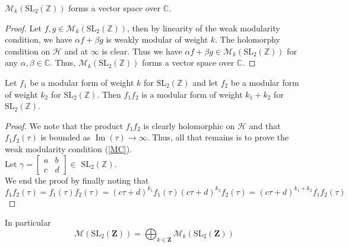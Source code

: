 \begin{proposition}
    $\mathcal{M}_{k}\left(\mathrm{SL}_{2}(\mathbb{Z})\right)$ forms a vector space over $\mathbb{C}$.
    \begin{proof}
         Let $f, g \in \mathcal{M}_{k}\left(\mathrm{SL}_{2}(\mathbb{Z})\right)$, then by linearity of the weak modularity condition, we have $\alpha f+\beta g$ is weakly modular of weight $k$. The holomorphy condition on $\mathcal{H}$ and at $\infty$ is clear. Thus we have $\alpha f+\beta g\in \mathcal{M}_{k}\left(\mathrm{SL}_{2}(\mathbb{Z})\right)$ for any $\alpha, \beta \in \mathbb{C}$.  Thus, $\mathcal{M}_{k}\left(\mathrm{SL}_{2}(\mathbb{Z})\right)$ forms a vector space over $\mathbb{C}$.
    \end{proof}
\end{proposition}

\begin{lemma}
Let $f_{1}$ be a modular form of weight $k$ for $\mathrm{SL}_{2}(\mathbb{Z})$ and let $f_{2}$ be a modular form of weight $k_{2}$ for $\mathrm{SL}_{2}(\mathbb{Z})$. Then $f_{1} f_{2}$ is a modular form of weight $k_{1}+k_{2}$ for $\mathrm{SL}_{2}(\mathbb{Z})$.
\begin{proof}
    We note that the product $f_{1} f_{2}$ is clearly holomorphic on $\mathcal{H}$ and that $f_{1} f_{2}(\tau)$ is bounded as $\operatorname{Im}(\tau) \rightarrow \infty$. Thus, all that remains is to prove the weak modularity condition (\ref{MC}). \\ Let $\gamma=\left[\begin{array}{ll}a & b \\ c & d\end{array}\right] \in$ $\mathrm{SL}_{2}(\mathbb{Z})$. \\ We end the proof by finally noting that $$f_{1} f_{2}(\tau)=f_{1}(\tau) f_{2}(\tau)=(c \tau+d)^{k_{1}} f_{1}(\tau)(c \tau+d)^{k_{2}} f_{2}(\tau)=(c \tau+d)^{k_{1}+k_{2}} f_{1} f_{2}(\tau)
$$

\end{proof}
\end{lemma}
In particular $$
\mathcal{M}\left(\mathrm{SL}_{2}(\mathbf{Z})\right)=\bigoplus_{k \in \mathbf{Z}} \mathcal{M}_{k}\left(\mathrm{SL}_{2}(\mathbf{Z})\right)
$$

